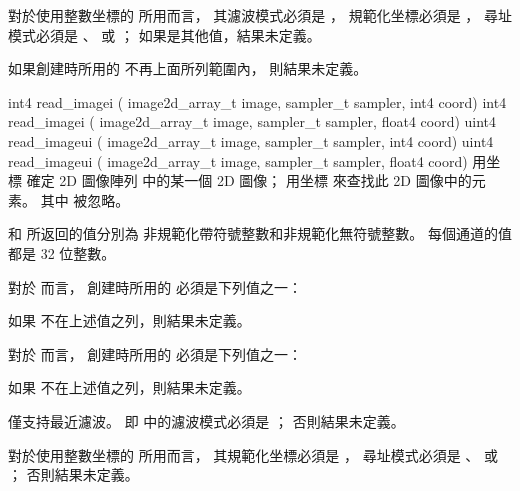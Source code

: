 對於使用整數坐標的  所用而言，
其濾波模式必須是 ，
規範化坐標必須是 ，
尋址模式必須是 、 
 或 ；
如果是其他值，結果未定義。

如果創建時所用的  不再上面所列範圍內，
則結果未定義。
\stopbuffer

int4 read_imagei (
	image2d_array_t image,
	sampler_t sampler,
	int4 coord)
int4 read_imagei (
	image2d_array_t image,
	sampler_t sampler,
	float4 coord)
uint4 read_imageui (
	image2d_array_t image,
	sampler_t sampler,
	int4 coord)
uint4 read_imageui (
	image2d_array_t image,
	sampler_t sampler,
	float4 coord)
\stopbuffer
{}
用坐標  確定 2D 圖像陣列  中的某一個 2D 圖像；
用坐標  來查找此 2D 圖像中的元素。
其中  被忽略。

 和  所返回的值分別為
非規範化帶符號整數和非規範化無符號整數。
每個通道的值都是 32 位整數。

對於  而言，
創建時所用的  必須是下列值之一：
\startigBase[indentnext=no]
\item {}
\item {}
\item {}
\stopigBase
如果  不在上述值之列，則結果未定義。

對於  而言，
創建時所用的  必須是下列值之一：
\startigBase[indentnext=no]
\item {}
\item {}
\item {}
\stopigBase
如果  不在上述值之列，則結果未定義。

 僅支持最近濾波。
即  中的濾波模式必須是 ；
否則結果未定義。

對於使用整數坐標的  所用而言，
其規範化坐標必須是 ，
尋址模式必須是 、 
 或 ；
否則結果未定義。
\stopbuffer

